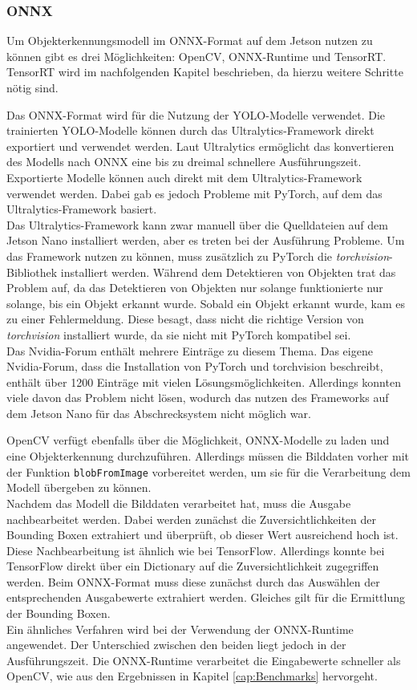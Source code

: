 \subsubsection{ONNX}

Um Objekterkennungsmodell im ONNX-Format auf dem Jetson nutzen zu können gibt es drei Möglichkeiten: OpenCV, ONNX-Runtime und TensorRT. TensorRT wird im nachfolgenden Kapitel beschrieben, da hierzu weitere Schritte nötig sind.

Das ONNX-Format wird für die Nutzung der \ac{YOLO}-Modelle verwendet. Die trainierten \ac{YOLO}-Modelle können durch das Ultralytics-Framework direkt exportiert und verwendet werden. Laut Ultralytics ermöglicht das konvertieren des Modells nach ONNX eine bis zu dreimal schnellere Ausführungszeit. \cite{ultralytics}
\\
Exportierte Modelle können auch direkt mit dem Ultralytics-Framework verwendet werden. Dabei gab es jedoch Probleme mit PyTorch, auf dem das Ultralytics-Framework basiert.
\\
Das Ultralytics-Framework kann zwar manuell über die Quelldateien auf dem Jetson Nano installiert werden, aber es treten bei der Ausführung Probleme. Um das Framework nutzen zu können, muss zusätzlich zu PyTorch die \textit{torchvision}-Bibliothek installiert werden. Während dem Detektieren von Objekten trat das Problem auf, da das Detektieren von Objekten nur solange funktionierte nur solange, bis ein Objekt erkannt wurde. Sobald ein Objekt erkannt wurde, kam es zu einer Fehlermeldung. Diese besagt, dass nicht die richtige Version von \textit{torchvision} installiert wurde, da sie nicht mit PyTorch kompatibel sei.
\\
Das Nvidia-Forum enthält mehrere Einträge zu diesem Thema. Das eigene Nvidia-Forum, dass die Installation von PyTorch und torchvision beschreibt, enthält über 1200 Einträge mit vielen Lösungsmöglichkeiten. Allerdings konnten viele davon das Problem nicht lösen, wodurch das nutzen des Frameworks auf dem Jetson Nano für das Abschrecksystem nicht möglich war. \cite{pytorch_jn}

OpenCV verfügt ebenfalls über die Möglichkeit, ONNX-Modelle zu laden und eine Objekterkennung durchzuführen. Allerdings müssen die Bilddaten vorher mit der Funktion \verb|blobFromImage| vorbereitet werden, um sie für die Verarbeitung dem Modell übergeben zu können.
\\
Nachdem das Modell die Bilddaten verarbeitet hat, muss die Ausgabe nachbearbeitet werden. Dabei werden zunächst die Zuversichtlichkeiten der Bounding Boxen extrahiert und überprüft, ob dieser Wert ausreichend hoch ist. Diese Nachbearbeitung ist ähnlich wie bei TensorFlow. Allerdings konnte bei TensorFlow direkt über ein Dictionary auf die Zuversichtlichkeit zugegriffen werden. Beim ONNX-Format muss diese zunächst durch das Auswählen der entsprechenden Ausgabewerte extrahiert werden. Gleiches gilt für die Ermittlung der Bounding Boxen. \cite{opencv_onnx}
\\
Ein ähnliches Verfahren wird bei der Verwendung der ONNX-Runtime angewendet. Der Unterschied zwischen den beiden liegt jedoch in der Ausführungszeit. Die ONNX-Runtime verarbeitet die Eingabewerte schneller als OpenCV, wie aus den Ergebnissen in Kapitel \ref{cap:Benchmarks} hervorgeht.

